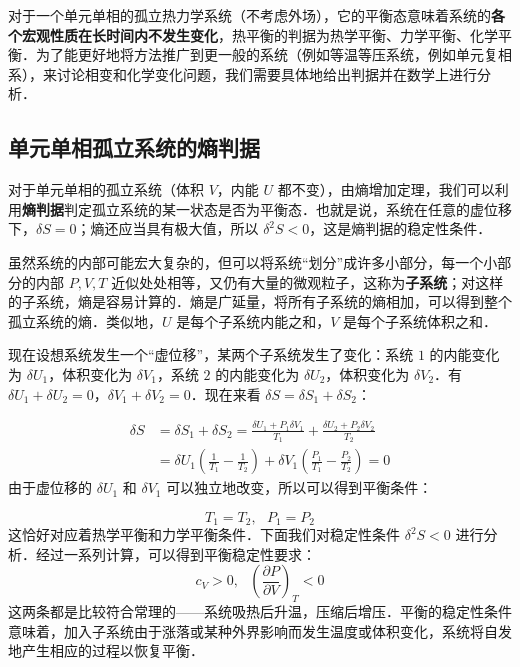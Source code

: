 
对于一个单元单相的孤立热力学系统（不考虑外场），它的平衡态意味着系统的\textbf{各个宏观性质在长时间内不发生变化}，热平衡的判据为热学平衡、力学平衡、化学平衡．为了能更好地将方法推广到更一般的系统（例如等温等压系统，例如单元复相系），来讨论相变和化学变化问题，我们需要具体地给出判据并在数学上进行分析．

\subsection{单元单相孤立系统的熵判据}

对于单元单相的孤立系统（体积 $V$，内能 $U$ 都不变），由熵增加定理，我们可以利用\textbf{熵判据}判定孤立系统的某一状态是否为平衡态．也就是说，系统在任意的虚位移下，$\delta S=0$；熵还应当具有极大值，所以 $\delta^2S<0$，这是熵判据的稳定性条件．

虽然系统的内部可能宏大复杂的，但可以将系统“划分”成许多小部分，每一个小部分的内部 $P,V,T$ 近似处处相等，又仍有大量的微观粒子，这称为\textbf{子系统}；对这样的子系统，熵是容易计算的．熵是广延量，将所有子系统的熵相加，可以得到整个孤立系统的熵．类似地，$U$ 是每个子系统内能之和，$V$ 是每个子系统体积之和．

现在设想系统发生一个“虚位移”，某两个子系统发生了变化：系统 $1$ 的内能变化为 $\delta U_1$，体积变化为 $\delta V_1$，系统 $2$ 的内能变化为 $\delta U_2$，体积变化为 $\delta V_2$．有 $\delta U_1+\delta U_2=0$，$\delta V_1+\delta V_2=0$．现在来看 $\delta S=\delta S_1+\delta S_2$：

\begin{align}
\delta S&=\delta S_1+\delta S_2=\frac{\delta U_1+P_1\delta V_1}{T_1}+\frac{\delta U_2+P_2\delta V_2}{T_2}
\\
&=\delta U_1\left(\frac{1}{T_1}-\frac{1}{T_2}\right)
+\delta V_1\left(\frac{P_1}{T_1}-\frac{P_2}{T_2}\right)=0
\end{align}
由于虚位移的 $\delta U_1$ 和 $\delta V_1$ 可以独立地改变，所以可以得到平衡条件：

\begin{equation}
T_1=T_2,\ \ \ P_1=P_2
\end{equation}
这恰好对应着热学平衡和力学平衡条件．下面我们对稳定性条件 $\delta^2 S<0$ 进行分析．经过一系列计算，可以得到平衡稳定性要求：
\begin{equation}
c_V>0,\ \ \ \left(\frac{\partial P}{\partial V}\right)_T<0
\end{equation}
这两条都是比较符合常理的——系统吸热后升温，压缩后增压．平衡的稳定性条件意味着，加入子系统由于涨落或某种外界影响而发生温度或体积变化，系统将自发地产生相应的过程以恢复平衡．

